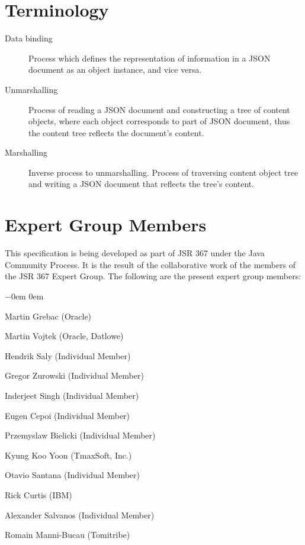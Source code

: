 \section{Terminology}
\label{terminology}

\begin{description}
\item[Data binding] Process which defines the representation of information in a JSON document as an object instance, and vice versa.
\item[Unmarshalling] Process of reading a JSON document and constructing a tree of content objects, 
where each object corresponds to part of JSON document, thus the content tree reflects the document's content.
\item[Marshalling] Inverse process to unmarshalling. Process of traversing content object tree and writing a JSON document that reflects the tree's content.

\end{description}

\section{Expert Group Members} 
\label{expert_group}

This specification is being developed as part of JSR 367 under the Java Community Process. 
It is the result of the collaborative work of the members of the JSR 367 Expert Group. 
The following are the present expert group members:

\begin{list}{$-$}{\parsep 0em  0em}
\item Martin Grebac (Oracle)
\item Martin Vojtek (Oracle, Datlowe)
\item Hendrik Saly (Individual Member)
\item Gregor Zurowski (Individual Member) 
\item Inderjeet Singh (Individual Member)
\item Eugen Cepoi (Individual Member)
\item Przemyslaw Bielicki (Individual Member)
\item Kyung Koo Yoon (TmaxSoft, Inc.)
\item Otavio Santana (Individual Member)
\item Rick Curtis (IBM)
\item Alexander Salvanos (Individual Member)
\item Romain Manni-Bucau (Tomitribe)
\end{list}


